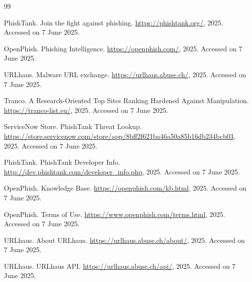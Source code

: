 \documentclass[journal,article,submit,pdftex,moreauthors]{Definitions/mdpi}
\begin{document}
\vspace{6pt} 



\begin{thebibliography}{99}

PhishTank. Join the fight against phishing. \url{https://phishtank.org/}, 2025. Accessed on 7 June 2025.

OpenPhish. Phishing Intelligence. \url{https://openphish.com/}, 2025. Accessed on 7 June 2025.

URLhaus. Malware URL exchange. \url{https://urlhaus.abuse.ch/}, 2025. Accessed on 7 June 2025.

Tranco. A Research-Oriented Top Sites Ranking Hardened Against Manipulation. \url{https://tranco-list.eu/}, 2025. Accessed on 7 June 2025.

ServiceNow Store. PhishTank Threat Lookup. \url{https://store.servicenow.com/store/app/8bff2f621ba46a50a85b16db234bcb03}, 2025. Accessed on 7 June 2025.

PhishTank. PhishTank Developer Info. \url{http://dev.phishtank.com/developer_info.php}, 2025. Accessed on 7 June 2025.

OpenPhish. Knowledge Base. \url{https://openphish.com/kb.html}, 2025. Accessed on 7 June 2025.

OpenPhish. Terms of Use. \url{https://www.openphish.com/terms.html}, 2025. Accessed on 7 June 2025.

URLhaus. About URLhaus. \url{https://urlhaus.abuse.ch/about/}, 2025. Accessed on 7 June 2025.

URLhaus. URLhaus API. \url{https://urlhaus.abuse.ch/api/}, 2025. Accessed on 7 June 2025.


\end{thebibliography}
\end{document}
